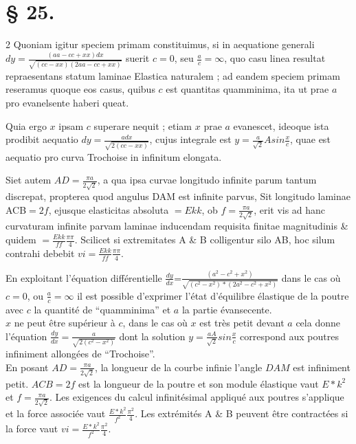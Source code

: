 \documentclass[a4paper,10pt]{article}
\begin{document}
\section*{§ 25.}
\begin{multicols}{2}
Quoniam igitur speciem primam constituimus, si in aequatione generali $dy=\frac{(aa-cc+xx)dx}{\sqrt{(cc-xx)(2aa-cc+xx)}}$ suerit $c=0$, seu $\frac{a}{c}=\infty$, quo casu linea resultat repraesentans statum laminae Elastica naturalem ; ad eandem speciem primam reseramus quoque eos casus, quibus $c$ est quantitas quamminima, ita ut prae $a$ pro evanelsente haberi queat.

Quia ergo $x$ ipsam $c$ superare nequit ; etiam $x$ prae $a$ evanescet, ideoque ista prodibit aequatio $dy=\frac{adx}{\sqrt{2(cc-xx)}}$, cujus integrale est $y=\frac{a}{\sqrt{2}}Asin\frac{x}{c}$, quae est aequatio pro curva Trochoise in infinitum elongata.

Siet autem $AD=\frac{\pi a}{2\sqrt{2}}$, a qua ipsa curvae longitudo infinite parum tantum discrepat, propterea quod angulus DAM est infinite parvus, Sit longitudo laminae ACB$=2f$, ejusque elasticitas absoluta $=Ekk$, ob $f=\frac{\pi a}{2\sqrt{2}}$, erit vis ad hanc curvaturam infinite parvam laminae inducendam requisita finitae magnitudinis \& quidem $=\frac{Ekk}{ff}\frac{\pi \pi}{4}$. Scilicet si extremitates A \& B colligentur silo AB, hoc silum contrahi debebit $vi=\frac{Ekk}{ff}\frac{\pi \pi}{4}$.

\columnbreak
En exploitant l'équation différentielle $\frac{dy}{dx}$=$\frac{(a^2-c^2+x^2)}{\sqrt{(c^2-x^2)*(2a^2-c^2+x^2)}}$ dans le cas où $c=0$, ou $\frac{a}{c}=\infty$ il est possible d'exprimer l'état d'équilibre élastique de la poutre avec $c$ la quantité de ``quamminima'' et $a$ la partie évansecente.\\

$x$ ne peut être supérieur à $c$, dans le cas où $x$ est très petit devant $a$ cela donne l'équation $\frac{dy}{dx}=\frac{a}{\sqrt{2(c^2-x^2)}}$ dont la solution $y=\frac{aA}{\sqrt{2}}sin\frac{x}{c}$ correspond aux poutres infiniment allongées de ``Trochoise''.\\

En posant $AD=\frac{\pi a}{2\sqrt{2}}$, la longueur de la courbe infinie l'angle $DAM$ est infiniment petit. $ACB=2f$ est la longueur de la poutre et son module élastique vaut $E*k^2$ et $f=\frac{\pi a}{2\sqrt{2}}$. Les exigences du calcul infinitésimal appliqué aux poutres s'applique et la force associée vaut $\frac{E*k^2}{f^2}\frac{\pi^2}{4}$. Les extrémités A \& B peuvent être contractées si la force vaut $vi=\frac{E*k^2}{f^2}\frac{\pi^2}{4}$.
\end{multicols}
\end{document}
